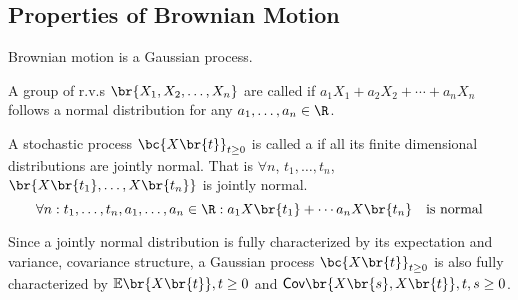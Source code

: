 \documentclass{article}
\newcommand{\Cov}{\textsf{Cov}}
\newcommand{\Exp}{\mathbb{E}}
\newcommand{\Brownian}[5]{%
\draw[#4] (0,0)
\foreach \x in {1,...,#1}
{   -- ++(#2,rand*#3)
}
node[right] {#5};
}
\begin{document}
    \subsection{Properties of Brownian Motion}
    \begin{center}
    \end{center}
    Brownian motion is a Gaussian process.
    \begin{definition}
        A group of r.v.s $\br{X_1, X_2, \ldots, X_n}$ are called  if $a_1X_1 + a_2 X_2 + \cdots + a_n X_n$ follows a normal distribution for any $a_1, \ldots, a_{n} \in \R$.
    \end{definition}
    \begin{definition}
        A stochastic process $\bc{X\br{t}}_{t \geq 0}$ is called a  if all its finite dimensional distributions are jointly normal. That is $\forall n$, $t_1, \ldots, t_n$, $\br{X\br{t_1}, \ldots, X\br{t_n}}$ is jointly normal.
        \[ \forall n: t_1, \ldots, t_n, a_1, \ldots, a_n \in \R: a_1X\br{t_1} + \cdots a_nX\br{t_n} \quad \text{is normal}\]
    \end{definition}
    Since a jointly normal distribution is fully characterized by its expectation and variance, covariance structure, a Gaussian process $\bc{X\br{t}}_{t \geq 0}$ is also fully characterized by $\Exp\br{X\br{t}}, t \geq 0$ and $\Cov\br{X\br{s}, X\br{t}}, t, s \geq 0$.
\end{document}
